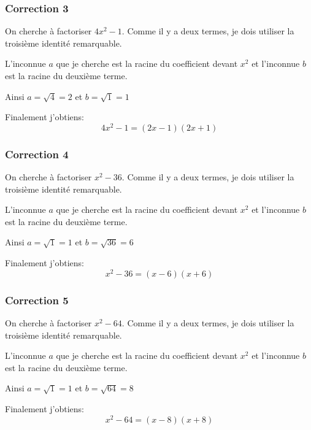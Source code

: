 \documentclass[15pt, mathserif]{beamer}
\begin{document}
\begin{frame}
\vspace{-10mm}
	\frametitle{Correction 3}
On cherche à factoriser $4x^2-1$. 
Comme il y a deux termes, je dois utiliser la troisième identité remarquable. 

 L'inconnue $a$ que je cherche est la racine du coefficient devant $x^2$ et l'inconnue $b$ est la racine du deuxième terme. 

 Ainsi $a = \sqrt{4} = 2$ et $b = \sqrt{1} = 1$

 Finalement j'obtiens: \[4x^2-1= (2x-1)(2x+1)\]
\end{frame}


\begin{frame}
\vspace{-10mm}
	\frametitle{Correction 4}
On cherche à factoriser $x^2-36$. 
Comme il y a deux termes, je dois utiliser la troisième identité remarquable. 

 L'inconnue $a$ que je cherche est la racine du coefficient devant $x^2$ et l'inconnue $b$ est la racine du deuxième terme. 

 Ainsi $a = \sqrt{1} = 1$ et $b = \sqrt{36} = 6$

 Finalement j'obtiens: \[x^2-36= (x-6)(x+6)\]
\end{frame}


\begin{frame}
\vspace{-10mm}
	\frametitle{Correction 5}
On cherche à factoriser $x^2-64$. 
Comme il y a deux termes, je dois utiliser la troisième identité remarquable. 

 L'inconnue $a$ que je cherche est la racine du coefficient devant $x^2$ et l'inconnue $b$ est la racine du deuxième terme. 

 Ainsi $a = \sqrt{1} = 1$ et $b = \sqrt{64} = 8$

 Finalement j'obtiens: \[x^2-64= (x-8)(x+8)\]
\end{frame}
\end{document}
